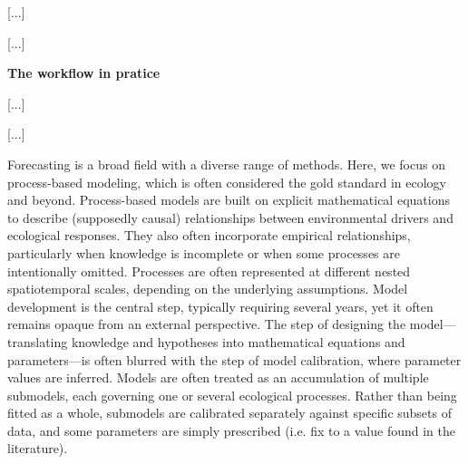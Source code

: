 \documentclass[11pt]{article}
\begin{document}
[...]

[...]

\vspace{0.5cm}
\noindent \textbf{The workflow in pratice}

[...]

[...]

Forecasting is a broad field with a diverse range of methods. Here, we focus on process-based modeling, which is often considered the gold standard in ecology and beyond. Process-based models are built on explicit mathematical equations to describe (supposedly causal) relationships between environmental drivers and ecological responses. They also often incorporate empirical relationships, particularly when knowledge is incomplete or when some processes are intentionally omitted. Processes are often represented at different nested spatiotemporal scales, depending on the underlying assumptions. Model development is the central step, typically requiring several years, yet it often remains opaque from an external perspective. The step of designing the model---translating knowledge and hypotheses into mathematical equations and parameters---is often blurred with the step of model calibration, where parameter values are inferred. Models are often treated as an accumulation of multiple submodels, each governing one or several ecological processes. Rather than being fitted as a whole, submodels are calibrated separately against specific subsets of data, and some parameters are simply prescribed (i.e. fix to a value found in the literature).
\end{document}
